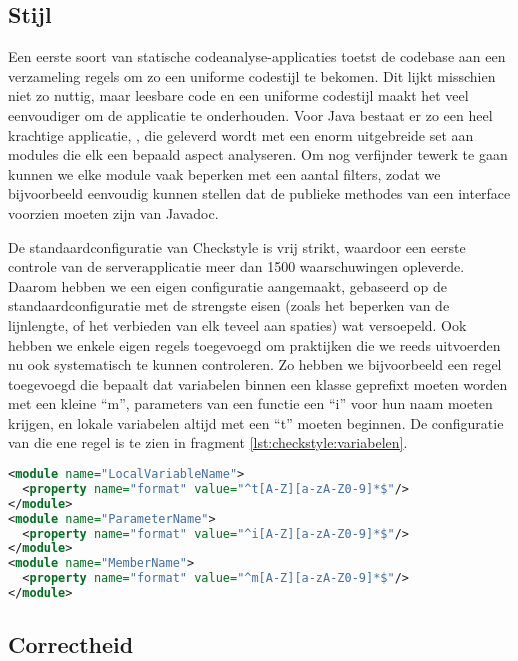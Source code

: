 \subsection{Stijl}
\label{server:realisatie:codeanalyse:stijl}

Een eerste soort van statische codeanalyse-applicaties toetst de codebase aan een verzameling regels om zo een uniforme codestijl te bekomen. Dit lijkt misschien niet zo nuttig, maar leesbare code en een uniforme codestijl maakt het veel eenvoudiger om de applicatie te onderhouden.
Voor Java bestaat er zo een heel krachtige applicatie, , die geleverd wordt met een enorm uitgebreide set aan modules die elk een bepaald aspect analyseren. Om nog verfijnder tewerk te gaan kunnen we elke module vaak beperken met een aantal filters, zodat we bijvoorbeeld eenvoudig kunnen stellen dat de publieke methodes van een interface voorzien moeten zijn van Javadoc.

De standaardconfiguratie van Checkstyle is vrij strikt, waardoor een eerste controle van de serverapplicatie meer dan 1500 waarschuwingen opleverde. Daarom hebben we een eigen configuratie aangemaakt, gebaseerd op de standaardconfiguratie met de strengste eisen (zoals het beperken van de lijnlengte, of het verbieden van elk teveel aan spaties) wat versoepeld. Ook hebben we enkele eigen regels toegevoegd om praktijken die we reeds uitvoerden nu ook systematisch te kunnen controleren. Zo hebben we bijvoorbeeld een regel toegevoegd die bepaalt dat variabelen binnen een klasse geprefixt moeten worden met een kleine ``m'', parameters van een functie een ``i'' voor hun naam moeten krijgen, en lokale variabelen altijd met een ``t'' moeten beginnen. De configuratie van die ene regel is te zien in fragment \ref{lst:checkstyle:variabelen}.

\begin{lstlisting}[language=XML, float, caption="Checkstyle configuratie voor de naamgeving van variabelen., label=lst:checkstyle:variabelen]
<module name="LocalVariableName">
  <property name="format" value="^t[A-Z][a-zA-Z0-9]*$"/>
</module>
<module name="ParameterName">
  <property name="format" value="^i[A-Z][a-zA-Z0-9]*$"/>
</module>
<module name="MemberName">
  <property name="format" value="^m[A-Z][a-zA-Z0-9]*$"/>
</module>
\end{lstlisting}

\subsection{Correctheid}
\label{server:realisatie:codeanalyse:correctheid}

